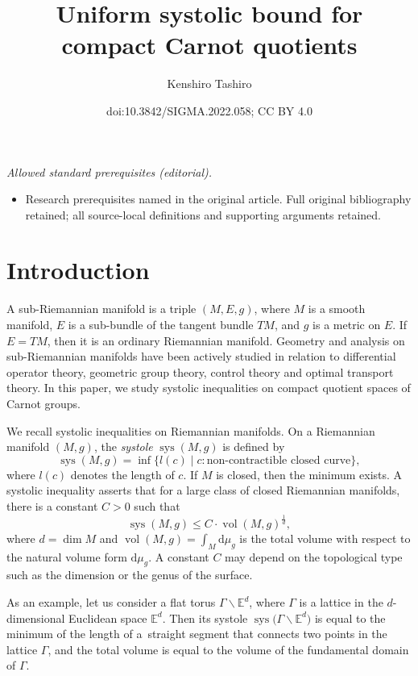 \documentclass[10pt,a4paper]{amsart}
\title{Uniform systolic bound for compact Carnot quotients}
\author{Kenshiro Tashiro}
\date{doi:10.3842/SIGMA.2022.058; CC BY 4.0}
\numberwithin{equation}{section}
\newcommand{\E}{\mathbb{E}}
\begin{document}
\maketitle
\noindent\textit{Allowed standard prerequisites (editorial).}\begin{itemize}
\item Research prerequisites named in the original article. Full original bibliography retained; all source-local definitions and supporting arguments retained.
\end{itemize}\medskip
\section{Introduction}

A sub-Riemannian manifold is a triple $(M,E,g)$,
where $M$ is a smooth manifold,
$E$ is a sub-bundle of the tangent bundle $TM$,
and $g$ is a metric on $E$.
If $E=TM$,
then it is an ordinary Riemannian manifold.
Geometry and analysis on sub-Riemannian manifolds have been actively studied in relation to differential operator theory,
geometric group theory,
control theory and optimal transport theory.
In this paper,
we study systolic inequalities on compact quotient spaces of Carnot groups.

We recall systolic inequalities on Riemannian manifolds.
On a Riemannian manifold $(M,g)$,
the \textit{systole} $\operatorname{sys}(M,g)$ is defined by
\[
\operatorname{sys}(M,g)=\inf\{l(c)\mid c\colon\text{non-contractible closed curve}\},
\]
where $l(c)$ denotes the length of $c$.
If $M$ is closed,
then the minimum exists.
A systolic inequality asserts that for a large class of closed Riemannian manifolds,
there is a constant $C>0$ such that
\[
\operatorname{sys}(M,g)\leq C\cdot \operatorname{vol}(M,g)^{\frac{1}{d}},
\]
where $d=\dim M$ and $\operatorname{vol}(M,g)=\int_{M}\mathrm{d}\mu_g$ is the total volume with respect to the natural volume form $\mathrm{d}\mu_g$.
A constant $C$ may depend on the topological type such as the dimension or the genus of the surface.

As an example,
let us consider a flat torus $\Gamma\backslash \E^d$,
where $\Gamma$ is a lattice in the $d$-dimensional Euclidean space $\E^d$.
Then its systole $\operatorname{sys}\big(\Gamma\backslash \E^d\big)$ is equal to the minimum of the length of a~straight segment that connects two points in the lattice $\Gamma$,
and the total volume is equal to the volume of the fundamental domain of $\Gamma$.
\end{document}
